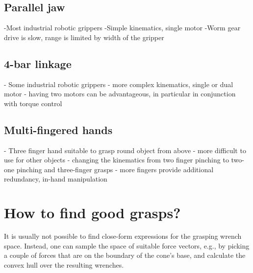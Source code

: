 \subsection{Parallel jaw}
-Most industrial robotic grippers
-Simple kinematics, single motor
-Worm gear drive is slow, range is limited by width of the gripper

\subsection{4-bar linkage}
- Some industrial robotic grippers
- more complex kinematics, single or dual motor
- having two motors can be advantageous, in particular in conjunction with torque control

\subsection{Multi-fingered hands}
- Three finger hand suitable to grasp round object from above
- more difficult to use for other objects
- changing the kinematics from two finger pinching to two-one pinching and three-finger grasps
- more fingers provide additional redundancy, in-hand manipulation



\section{How to find good grasps?}

It is usually not possible to find close-form expressions for the grasping wrench space. Instead, one can sample the space of suitable force vectors, e.g., by picking a couple of forces that are on the boundary of the cone's base, and calculate the convex hull over the resulting wrenches.



